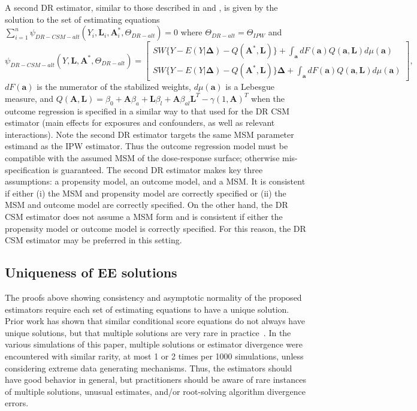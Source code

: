 \documentclass[12pt]{article}
\begin{document}
A second DR estimator, similar to those described in \citet{robins2000b} and \citet{neugebauer2005}, is given by the solution to the set of estimating equations \newline $\sum_{i=1}^{n} \psi_{DR-CSM-alt}(Y_{i}, \bm{L}_{i}, \bm{A}^{*}_{i}, \Theta_{DR-alt}) = 0$ where $\Theta_{DR-alt} = \Theta_{IPW}$ and
\begin{equation*}
    \psi_{DR-CSM-alt}(Y, \bm{L}, \bm{A}^{*}, \Theta_{DR-alt}) =
    \begin{bmatrix}
       SW \{ Y - E(Y | \bm{\Delta}) - Q(\bm{A}^{*}, \bm{L}) \} + \int_{\bm{a}} dF(\bm{a})Q(\bm{a}, \bm{L})d\mu (\bm{a}) \\
       SW \{ Y - E(Y | \bm{\Delta}) - Q(\bm{A}^{*}, \bm{L}) \} \bm{\Delta} + \int_{\bm{a}} dF(\bm{a})Q(\bm{a}, \bm{L})d\mu (\bm{a})
    \end{bmatrix},
\end{equation*}
$dF(\bm{a})$ is the numerator of the stabilized weights, $d\mu (\bm{a})$ is a Lebesgue measure, and $Q(\bm{A}, \bm{L}) = \beta_{0} + \bm{A} \beta_{a} + \bm{L} \beta_{l} + \bm{A} \beta_{al}\bm{L}^{T} - \gamma (1, \bm{A})^{T}$ when the outcome regression is specified in a similar way to that used for the DR CSM estimator (main effects for exposures and confounders, as well as relevant interactions). Note the second DR estimator targets the same MSM parameter estimand as the IPW estimator. Thus the outcome regression model must be compatible with the assumed MSM of the dose-response surface; otherwise mis-specification is guaranteed. The second DR estimator makes key three assumptions: a propensity model, an outcome model, and a MSM. It is consistent if either (i) the MSM and propensity model are correctly specified or (ii) the MSM and outcome model are correctly specified. On the other hand, the DR CSM estimator does not assume a MSM form and is consistent if either the propensity model or outcome model is correctly specified. For this reason, the DR CSM estimator may be preferred in this setting.

\subsection{Uniqueness of EE solutions}

The proofs above showing consistency and asymptotic normality of the proposed estimators require each set of estimating equations to have a unique solution. Prior work has shown that similar conditional score equations do not always have unique solutions, but that multiple solutions are very rare in practice~\citep{stefanski1987}. In the various simulations of this paper, multiple solutions or estimator divergence were encountered with similar rarity, at most 1 or 2 times per 1000 simulations, unless considering extreme data generating mechanisms. Thus, the estimators should have good behavior in general, but practitioners should be aware of rare instances of multiple solutions, unusual estimates, and/or root-solving algorithm divergence errors.
\end{document}
